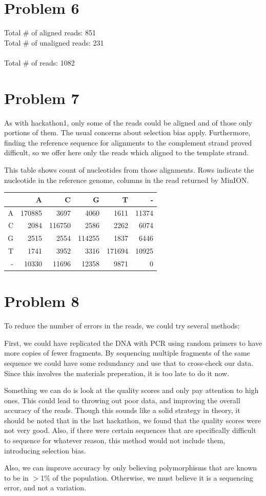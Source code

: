 \documentclass[11pt]{article}
\begin{document}
\section*{Problem 6}
Total \# of aligned reads: 851\\
Total \# of unaligned reads: 231\\
\\
Total \# of reads: 1082\\
\section*{Problem 7}
As with hackathon1, only some of the reads could be aligned and of those only portions of them.  The usual concerns about selection bias apply.  Furthermore, finding the reference sequence for alignments to the complement strand proved difficult, so we offer here only the reads which aligned to the template strand.

This table shows count of nucleotides from those alignments.  Rows indicate the nucleotide in the reference genome, columns in the read returned by MinION.


\begin{tabular}{r||r|r|r|r|r}
  & A & C & G & T & -\\ \hline
\hline
A & 170885 & 3697 & 4060 & 1611 & 11374\\ 
\hline
C & 2084 & 116750 & 2586 & 2262 & 6074\\ 
\hline
G & 2515 & 2554 & 114255 & 1837 & 6446\\ 
\hline
T & 1741 & 3952 & 3316 & 171694 & 10925\\ 
\hline
- & 10330 & 11696 & 12358 & 9871 & 0\\ 
\end{tabular}
\section*{Problem 8}
To reduce the number of errors in the reads, we could try several methods:

First, we could have replicated the DNA with PCR using random primers to have more copies of
fewer fragments. By sequencing multiple fragments of the same sequence we could have some redundancy and 
use that to cross-check our data.  Since this involves the materials preperation, it is too late to do it now.

Something we can do is look at the quality scores and only pay attention to high ones.
This could lead to throwing out poor data, and improving the overall accuracy
of the reads. Though this sounds like a solid strategy in theory, it should be
noted that in the last hackathon, we found that the quality scores were not
very good. Also, if there were certain sequences that are specifically difficult to sequence
for whatever reason, this method would not include them, introducing selection bias.

Also, we can improve accuracy by only believing polymorphisms that are known 
to be in $>$1\% of the population. Otherwise, we must believe it is a sequencing error, and
not a variation. 
\end{document}
